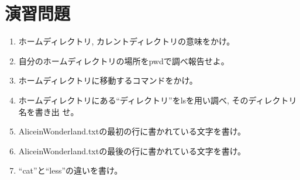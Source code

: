 \section{演習問題}

\begin{enumerate}
\item ホームディレクトリ, カレントディレクトリの意味をかけ。

\item 自分のホームディレクトリの場所をpwdで調べ報告せよ。

\item ホームディレクトリに移動するコマンドをかけ。

\item ホームディレクトリにある``ディレクトリ''をlsを用い調べ, そのディレクトリ名を書き出
      せ。

\item AliceinWonderland.txtの最初の行に書かれている文字を書け。
\item AliceinWonderland.txtの最後の行に書かれている文字を書け。

\item ``cat''と``less''の違いを書け。

\end{enumerate}
